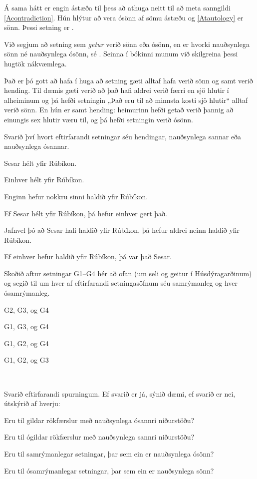 Á sama hátt er engin ástæða til þess að athuga neitt til að meta sanngildi \ref{Acontradiction}. Hún hlýtur að vera ósönn af sömu ástæðu og \ref{Atautology} er sönn. Þessi setning er .

Við segjum að setning sem \emph{getur} verið sönn eða ósönn, en er hvorki nauðsynlega sönn né nauðsynlega ósönn, sé . Seinna í bókinni munum við skilgreina þessi hugtök nákvæmlega.

Það er þó gott að hafa í huga að setning gæti alltaf hafa verið sönn og samt verið hending. Til dæmis gæti verið að það hafi aldrei verið færri en sjö hlutir í alheiminum og þá hefði setningin „Það eru til að minnsta kosti sjö hlutir“ alltaf verið sönn. En hún er samt hending: heimurinn hefði getað verið þannig að einungis sex hlutir væru til, og þá hefði setningin verið ósönn.


\practiceproblems
\problempart
\label{pr.EnglishTautology}
Svarið því hvort eftirfarandi setningar séu hendingar, nauðsynlega sannar eða nauðsynlega ósannar.
\begin{earg}
\item Sesar hélt yfir Rúbíkon.
\item Einhver hélt yfir Rúbíkon.
\item Enginn hefur nokkru sinni haldið yfir Rúbíkon.
\item Ef Sesar hélt yfir Rúbíkon, þá hefur einhver gert það.
\item Jafnvel þó að Sesar hafi haldið yfir Rúbíkon, þá hefur aldrei neinn haldið yfir Rúbíkon.
\item Ef einhver hefur haldið yfir Rúbíkon, þá var það Sesar.
\end{earg}

\problempart
\label{pr.MartianGiraffes}
Skoðið aftur setningar G1--G4 hér að ofan (um seli og geitur í Húsdýragarðinum) og segið til um hver af eftirfarandi setningasöfnum séu samrýmanleg og hver ósamrýmanleg.

\begin{earg}
\item G2, G3, og G4
\item G1, G3, og G4
\item G1, G2, og G4
\item G1, G2, og G3
\end{earg}

\

\problempart
Svarið eftirfarandi spurningum. Ef svarið er já, sýnið dæmi, ef svarið er nei, útskýrið af hverju:
\begin{earg}
\item Eru til gildar rökfærslur með nauðsynlega ósannri niðurstöðu?
\item Eru til ógildar rökfærslur með nauðsynlega sannri niðurstöðu?
\item Eru til samrýmanlegar setningar, þar sem ein er nauðsynlega ósönn?
\item Eru til ósamrýmanlegar setningar, þar sem ein er nauðsynlega sönn?
\end{earg}
